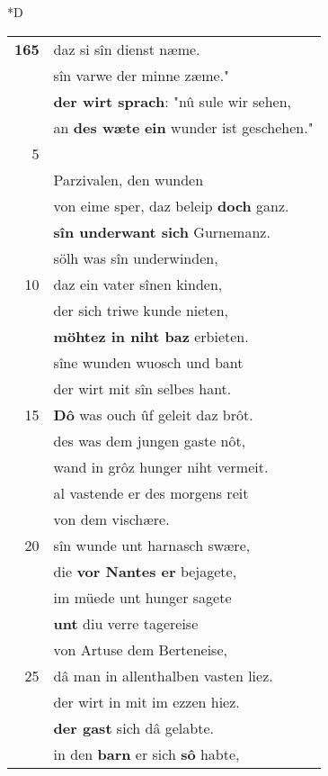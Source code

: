 \documentclass[8pt,a4paper,notitlepage]{article}
\begin{document}
\begin{table}[ht]
\begin{minipage}[t]{0.5\linewidth}
\small
\begin{center}*D
\end{center}
\begin{tabular}{rl}
\textbf{165} & daz si sîn dienst næme.\\ 
 & sîn varwe der minne zæme."\\ 
 & \textbf{der wirt sprach}: "nû sule wir sehen,\\ 
 & an \textbf{des wæte} \textbf{ein} wunder ist geschehen."\\ 
5 & \textbf{\begin{large}S\end{large}i giengen}, dâ si vunden\\ 
 & Parzivalen, den wunden\\ 
 & von eime sper, daz beleip \textbf{doch} ganz.\\ 
 & \textbf{sîn underwant sich} Gurnemanz.\\ 
 & sölh was sîn underwinden,\\ 
10 & daz ein vater sînen kinden,\\ 
 & der sich triwe kunde nieten,\\ 
 & \textbf{möhtez in niht baz} erbieten.\\ 
 & sîne wunden wuosch und bant\\ 
 & der wirt mit sîn selbes hant.\\ 
15 & \textbf{Dô} was ouch ûf geleit daz brôt.\\ 
 & des was dem jungen gaste nôt,\\ 
 & wand in grôz hunger niht vermeit.\\ 
 & al vastende er des morgens reit\\ 
 & von dem vischære.\\ 
20 & sîn wunde unt harnasch swære,\\ 
 & die \textbf{vor Nantes er} bejagete,\\ 
 & im müede unt hunger sagete\\ 
 & \textbf{unt} diu verre tagereise\\ 
 & von Artuse dem Berteneise,\\ 
25 & dâ man in allenthalben vasten liez.\\ 
 & der wirt in mit im ezzen hiez.\\ 
 & \textbf{der gast} sich dâ gelabte.\\ 
 & in den \textbf{barn} er sich \textbf{sô} habte,\\ 

\end{tabular}
\end{minipage}
\end{table}
\end{document}
